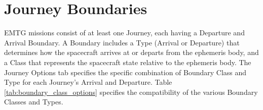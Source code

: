 \chapter{Journey Boundaries}
\label{chap:journey_boundaries}
\ac{EMTG} missions consist of at least one Journey, each having a Departure and Arrival Boundary. A Boundary includes a Type (Arrival or Departure) that determines how the spacecraft arrives at or departs from the ephemeris body, and a Class that represents the spacecraft state relative to the ephemeris body. The Journey Options tab specifies the specific combination of Boundary Class and Type for each Journey's Arrival and Departure. Table \ref{tab:boundary_class_options} specifies the compatibility of the various Boundary Classes and Types.


\begin{table}[H]
\end{table}
